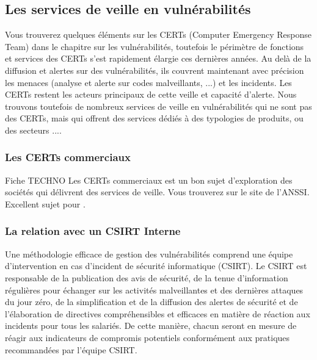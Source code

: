 \uchap{\jobname}

\subsection{Les services de veille en vulnérabilités}

Vous trouverez quelques éléments sur les CERTs (Computer Emergency Response Team) dans le chapitre sur les vulnérabilités, toutefois le périmètre de fonctions et services des CERTs s'est rapidement élargie ces dernières années. Au delà de la diffusion et alertes sur des vulnérabilités, ils couvrent maintenant avec précision les menaces (analyse et alerte sur codes malveillants, ...) et les incidents. Les CERTs restent les acteurs principaux de cette veille et capacité d'alerte.  
Nous trouvons toutefois de nombreux services de veille en vulnérabilités qui ne sont pas des CERTs, mais qui offrent des services dédiés à des typologies de produits, ou des secteurs ....

\subsubsection{Les CERTs commerciaux}

\begin{techworkbox}{Fiche TECHNO}
	Les CERTs commerciaux est un bon sujet d'exploration des sociétés qui délivrent des services de veille. Vous trouverez 
	 sur le site de l'ANSSI.  Excellent sujet pour \fichetech.
\end{techworkbox}

\subsubsection{La relation avec un CSIRT Interne }

	Une méthodologie efficace de gestion des vulnérabilités comprend une équipe d’intervention en cas d’incident de sécurité informatique (CSIRT). Le CSIRT est responsable de la publication des avis de sécurité, de la tenue d'information régulières pour échanger sur les activités malveillantes et des dernières attaques du jour zéro, de la simplification et de la diffusion des alertes de sécurité et de l’élaboration de directives compréhensibles et efficaces en matière de réaction aux incidents pour tous les salariés. De cette manière, chacun seront en mesure de réagir aux indicateurs de compromis potentiels conformément aux pratiques recommandées par l'équipe CSIRT.